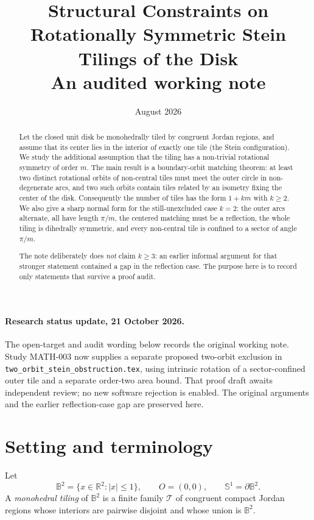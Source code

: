 \documentclass[10.5pt]{article}
\title{Structural Constraints on Rotationally Symmetric Stein Tilings of the Disk\\\large An audited working note}
\author{}
\date{August 2026}
\theoremstyle{remark}
\newcommand{\B}{\mathbb B}
\newcommand{\Sph}{\mathbb S}
\begin{document}
\maketitle
\vspace{-1.5em}

\begin{abstract}
Let the closed unit disk be monohedrally tiled by congruent Jordan regions, and assume that its center lies in the interior of exactly one tile (the Stein configuration). We study the additional assumption that the tiling has a non-trivial rotational symmetry of order $m$. The main result is a boundary-orbit matching theorem: at least two distinct rotational orbits of non-central tiles must meet the outer circle in non-degenerate arcs, and two such orbits contain tiles related by an isometry fixing the center of the disk. Consequently the number of tiles has the form $1+km$ with $k\ge 2$. We also give a sharp normal form for the still-unexcluded case $k=2$: the outer arcs alternate, all have length $\pi/m$, the centered matching must be a reflection, the whole tiling is dihedrally symmetric, and every non-central tile is confined to a sector of angle $\pi/m$.

The note deliberately does \emph{not} claim $k\ge3$: an earlier informal argument for that stronger statement contained a gap in the reflection case. The purpose here is to record only statements that survive a proof audit.
\end{abstract}

\paragraph{Research status update, 21 October 2026.}
The open-target and audit wording below records the original working note.
Study MATH-003 now supplies a separate proposed two-orbit exclusion in
\texttt{two\_orbit\_stein\_obstruction.tex}, using intrinsic rotation of a
sector-confined outer tile and a separate order-two area bound. That proof
draft awaits independent review; no new software rejection is enabled.
The original arguments and the earlier reflection-case gap are preserved here.

\section{Setting and terminology}

Let
\[
 \B^2=\{x\in\mathbb R^2:|x|\le 1\},\qquad O=(0,0),\qquad \Sph^1=\partial\B^2.
\]
A \emph{monohedral tiling} of $\B^2$ is a finite family $\mathcal T$ of congruent compact Jordan regions whose interiors are pairwise disjoint and whose union is $\B^2$.
\end{document}
